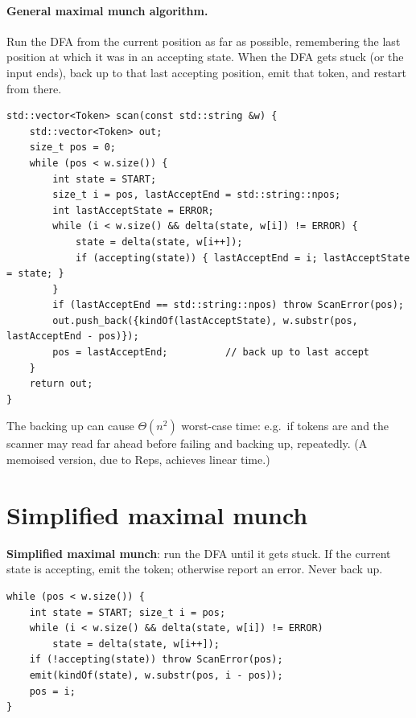 \paragraph{General maximal munch algorithm.} Run the DFA from the current position as far as
possible, remembering the last position at which it was in an accepting state. When the DFA
gets stuck (or the input ends), back up to that last accepting position, emit that token,
and restart from there.

\begin{lstlisting}[style=cpp]
std::vector<Token> scan(const std::string &w) {
    std::vector<Token> out;
    size_t pos = 0;
    while (pos < w.size()) {
        int state = START;
        size_t i = pos, lastAcceptEnd = std::string::npos;
        int lastAcceptState = ERROR;
        while (i < w.size() && delta(state, w[i]) != ERROR) {
            state = delta(state, w[i++]);
            if (accepting(state)) { lastAcceptEnd = i; lastAcceptState = state; }
        }
        if (lastAcceptEnd == std::string::npos) throw ScanError(pos);
        out.push_back({kindOf(lastAcceptState), w.substr(pos, lastAcceptEnd - pos)});
        pos = lastAcceptEnd;          // back up to last accept
    }
    return out;
}
\end{lstlisting}

The backing up can cause $\Theta(n^2)$ worst-case time: e.g.\ if tokens are  and
 the scanner may read far ahead before failing and backing up, repeatedly.
(A memoised version, due to Reps, achieves linear time.)

\section{Simplified maximal munch}

\begin{definition}
\textbf{Simplified maximal munch}: run the DFA until it gets stuck. If the current state
is accepting, emit the token; otherwise report an error. Never back up.
\end{definition}

\begin{lstlisting}[style=cpp]
while (pos < w.size()) {
    int state = START; size_t i = pos;
    while (i < w.size() && delta(state, w[i]) != ERROR)
        state = delta(state, w[i++]);
    if (!accepting(state)) throw ScanError(pos);
    emit(kindOf(state), w.substr(pos, i - pos));
    pos = i;
}
\end{lstlisting}

